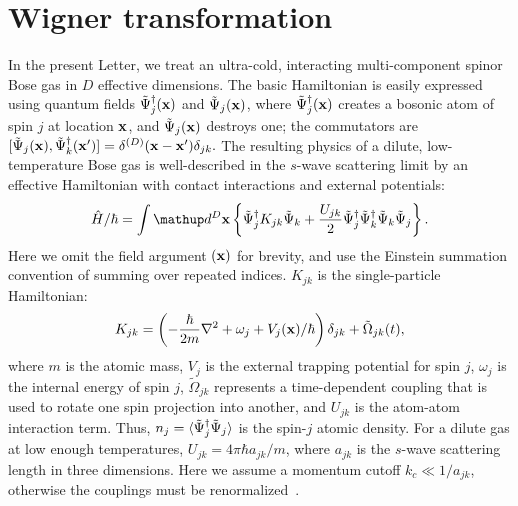 \section{Wigner transformation}





In the present Letter, we treat an ultra-cold,
interacting multi-component spinor Bose gas in $D$ effective dimensions.
The basic Hamiltonian is easily expressed using quantum fields
$\tilde{\Psi}_j^{\dagger}(\mathbf{x})$ and $\tilde{\Psi}_j(\mathbf{x})$,
where $\tilde{\Psi}_j^{\dagger}(\mathbf{x})$ creates a bosonic atom of spin $j$
at location $\mathbf{x}$, and $\tilde{\Psi}_j(\mathbf{x})$ destroys one;
the commutators are
$[\tilde{\Psi}_j(\mathbf{x}),\tilde{\Psi}_k^{\dagger}(\mathbf{x}^\prime)] =
\delta^{(D)}(\mathbf{x}-\mathbf{x}^\prime)\delta_{jk}.$
The resulting physics of a dilute, low-temperature Bose gas
is well-described in the $s$-wave scattering limit by an effective Hamiltonian
with contact interactions and external potentials:
\begin{equation}
    \hat{H} / \hbar = \int \upd^{D}\xvec \left\{
        \Psiop_j^{\dagger} K_{jk} \Psiop_k +
        \frac{U_{jk}}{2} \Psiop_j^{\dagger} \Psiop_k^{\dagger}
        \Psiop_k \Psiop_j
    \right\}.
\end{equation}
Here we omit the field argument $(\mathbf{x})$ for brevity,
and use the Einstein summation convention of summing over repeated indices.
$K_{jk}$ is the single-particle Hamiltonian:
\begin{equation}
    K_{jk} = \left( -\frac{\hbar}{2m} \nabla^2 + \omega_j + V_j(\mathbf{x}) / \hbar \right) \delta_{jk} +
        \tilde{\Omega}_{jk}(t),
\end{equation}
where $m$ is the atomic mass, $V_j$ is the external trapping potential for spin $j$,
$\omega_j$ is the internal energy of spin $j$,
$\tilde{\Omega}_{jk}$ represents a time-dependent coupling
that is used to rotate one spin projection into another,
and $U_{jk}$ is the atom-atom interaction term.
Thus, $n_j = \langle \tilde{\Psi}_j^{\dagger} \tilde{\Psi}_j \rangle$
is the spin-$j$ atomic density.
For a dilute gas at low enough temperatures,
$U_{jk}=4\pi\hbar a_{jk} / m$, where $a_{jk}$ is the $s$-wave scattering length in three dimensions.
Here we assume a momentum cutoff $k_{c} \ll 1 / a_{jk}$,
otherwise the couplings must be renormalized~\cite{Sinatra2002}.

